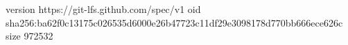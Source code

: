 version https://git-lfs.github.com/spec/v1
oid sha256:ba62f0c13175c026535d6000e26b47723c11df29e3098178d770bb666ece626c
size 972532
